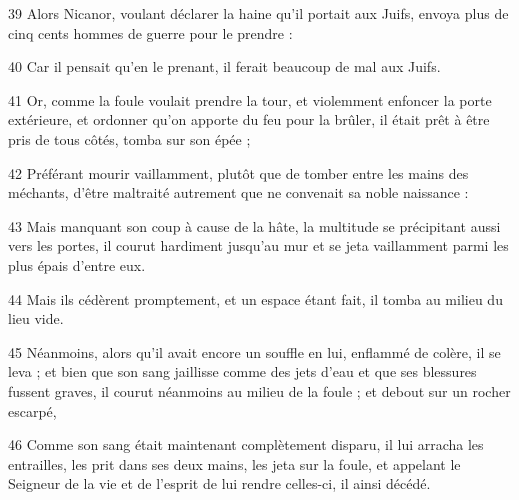 \par 39 Alors Nicanor, voulant déclarer la haine qu'il portait aux Juifs, envoya plus de cinq cents hommes de guerre pour le prendre :
\par 40 Car il pensait qu'en le prenant, il ferait beaucoup de mal aux Juifs.
\par 41 Or, comme la foule voulait prendre la tour, et violemment enfoncer la porte extérieure, et ordonner qu'on apporte du feu pour la brûler, il était prêt à être pris de tous côtés, tomba sur son épée ;
\par 42 Préférant mourir vaillamment, plutôt que de tomber entre les mains des méchants, d'être maltraité autrement que ne convenait sa noble naissance :
\par 43 Mais manquant son coup à cause de la hâte, la multitude se précipitant aussi vers les portes, il courut hardiment jusqu'au mur et se jeta vaillamment parmi les plus épais d'entre eux.
\par 44 Mais ils cédèrent promptement, et un espace étant fait, il tomba au milieu du lieu vide.
\par 45 Néanmoins, alors qu'il avait encore un souffle en lui, enflammé de colère, il se leva ; et bien que son sang jaillisse comme des jets d'eau et que ses blessures fussent graves, il courut néanmoins au milieu de la foule ; et debout sur un rocher escarpé,
\par 46 Comme son sang était maintenant complètement disparu, il lui arracha les entrailles, les prit dans ses deux mains, les jeta sur la foule, et appelant le Seigneur de la vie et de l'esprit de lui rendre celles-ci, il ainsi décédé.



